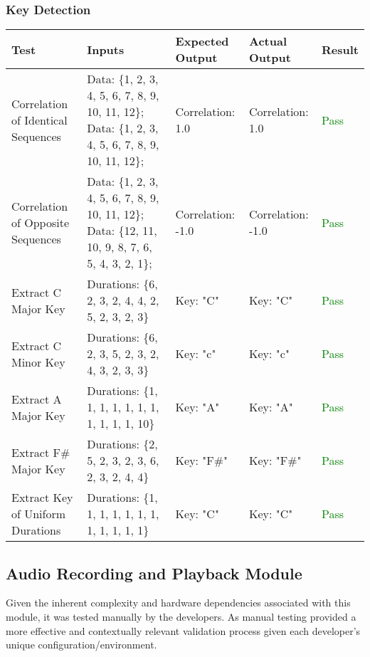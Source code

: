 \documentclass[12pt, titlepage]{article}
\begin{document}
\subsubsection{Key Detection}
\begin{longtable}{|L{3cm}|L{3cm}|L{2.5cm}|L{2.5cm}|l|}
  \hline
  \textbf{Test} & \textbf{Inputs} & \textbf{Expected Output} & \textbf{Actual Output} & \textbf{Result} \\
  \hline
  Correlation of Identical Sequences &
    Data: \{1, 2, 3, 4, 5, 6, 7, 8, 9, 10, 11, 12\}; \newline
    Data: \{1, 2, 3, 4, 5, 6, 7, 8, 9, 10, 11, 12\}; &
    Correlation: 1.0 &
    Correlation: 1.0 &
    \textcolor{green}{Pass} \\
  \hline
  Correlation of Opposite Sequences &
    Data: \{1, 2, 3, 4, 5, 6, 7, 8, 9, 10, 11, 12\}; \newline
    Data: \{12, 11, 10, 9, 8, 7, 6, 5, 4, 3, 2, 1\}; &
    Correlation: -1.0 &
    Correlation: -1.0 &
    \textcolor{green}{Pass} \\
  \hline
  Extract C Major Key &
    Durations: \{6, 2, 3, 2, 4, 4, 2, 5, 2, 3, 2, 3\} &
    Key: "C" &
    Key: "C" &
    \textcolor{green}{Pass} \\
  \hline
  Extract C Minor Key &
    Durations: \{6, 2, 3, 5, 2, 3, 2, 4, 3, 2, 3, 3\} &
    Key: "c" &
    Key: "c" &
    \textcolor{green}{Pass} \\
  \hline
  Extract A Major Key &
    Durations: \{1, 1, 1, 1, 1, 1, 1, 1, 1, 1, 1, 10\} &
    Key: "A" &
    Key: "A" &
    \textcolor{green}{Pass} \\
  \hline
  Extract F\# Major Key &
    Durations: \{2, 5, 2, 3, 2, 3, 6, 2, 3, 2, 4, 4\} &
    Key: "F\#" &
    Key: "F\#" &
    \textcolor{green}{Pass} \\
  \hline
  Extract Key of Uniform Durations &
    Durations: \{1, 1, 1, 1, 1, 1, 1, 1, 1, 1, 1, 1\} &
    Key: "C" &
    Key: "C" &
    \textcolor{green}{Pass} \\
  \hline
\end{longtable}

\subsection{Audio Recording and Playback Module}
Given the inherent complexity and hardware dependencies associated with this module, it 
was tested manually by the developers. As manual testing provided a more effective and contextually 
relevant validation process given each developer's unique configuration/environment.
\end{document}
